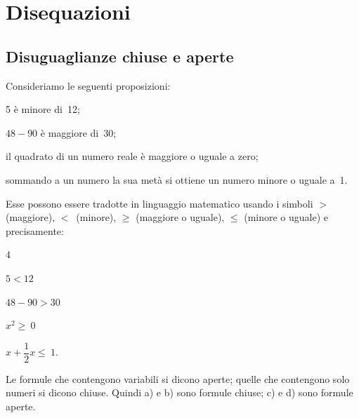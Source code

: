 


\chapter{Disequazioni}


\section{Disuguaglianze chiuse e aperte}
\label{sec:dis_disguagianze}
Consideriamo le seguenti proposizioni:

\begin{enumeratea}
\item 5 è minore di~12;
\item \(48-90\) è maggiore di~30;
\item il quadrato di un numero reale è maggiore o uguale a zero;
\item sommando a un numero la sua metà si ottiene un numero minore
o uguale a~1.
\end{enumeratea}

Esse possono essere tradotte in linguaggio matematico usando i simboli
\(>\) (maggiore), \(<\)~(minore), \({\geq}\) (maggiore o uguale), \({\leq}\) 
(minore o uguale) e precisamente:

\begin{htmulticols}{4}
 \begin{enumeratea}
\item \(5<12\)
\item \(48-90>30\)
\item \(x^{2}\ge~0\)
\item \(x+\dfrac{1}{2}x\le~1\).
 \end{enumeratea}
\end{htmulticols}
Le formule che contengono variabili si dicono aperte; quelle che
contengono solo numeri si dicono chiuse. Quindi a) e b) sono formule
chiuse; c) e d) sono formule aperte.

